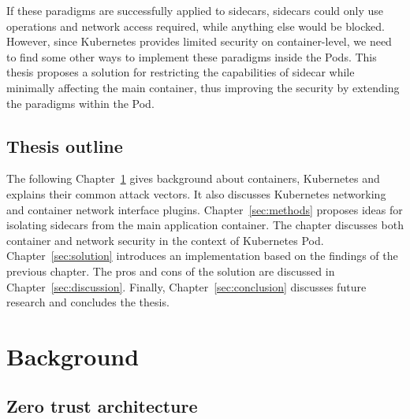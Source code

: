 \documentclass[english, 12pt, a4paper, sci, utf8, a-2b, online]{aaltothesis}
\begin{document}
If these paradigms are successfully applied to sidecars, sidecars could only use operations and network access required, while anything else would be blocked. However, since Kubernetes provides limited security on container-level, we need to find some other ways to implement these paradigms inside the Pods. This thesis proposes a solution for restricting the capabilities of sidecar while minimally affecting the main container, thus improving the security by extending the paradigms within the Pod.

\subsection{Thesis outline}

The following Chapter~\ref{sec:bg} gives background about containers, Kubernetes and explains their common attack vectors. It also discusses Kubernetes networking and container network interface plugins. Chapter~\ref{sec:methods} proposes ideas for isolating sidecars from the main application container. The chapter discusses both container and network security in the context of Kubernetes Pod. Chapter~\ref{sec:solution} introduces an implementation based on the findings of the previous chapter. The pros and cons of the solution are discussed in Chapter~\ref{sec:discussion}. Finally, Chapter~\ref{sec:conclusion} discusses future research and concludes the thesis.

\clearpage

\section{Background} \label{sec:bg}

\subsection{Zero trust architecture}

\end{document}
